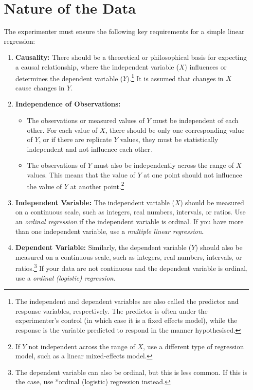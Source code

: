 \documentclass[
  letterpaper,
]{book}
\providecommand{\tightlist}{%
  \setlength{\itemsep}{0pt}\setlength{\parskip}{0pt}}\usepackage{longtable,booktabs,array}
\begin{document}
\section{Nature of the Data}\label{nature-of-the-data}

The experimenter must ensure the following key requirements for a simple
linear regression:

\begin{enumerate}
\def\labelenumi{\arabic{enumi}.}
\item
  \textbf{Causality:} There should be a theoretical or philosophical
  basis for expecting a causal relationship, where the independent
  variable (\(X\)) influences or determines the dependent variable
  (\(Y\)).\footnote{The independent and dependent variables are also
    called the predictor and response variables, respectively. The
    predictor is often under the experimenter's control (in which case
    it is a fixed effects model), while the response is the variable
    predicted to respond in the manner hypothesised.} It is assumed that
  changes in \(X\) cause changes in \(Y\).
\item
  \textbf{Independence of Observations:}

  \begin{itemize}
  \tightlist
  \item
    The observations or measured values of \(Y\) must be independent of
    each other. For each value of \(X\), there should be only one
    corresponding value of \(Y\), or if there are replicate \(Y\)
    values, they must be statistically independent and not influence
    each other.
  \item
    The observations of \(Y\) must also be independently across the
    range of \(X\) values. This means that the value of \(Y\) at one
    point should not influence the value of \(Y\) at another
    point.\footnote{If \(Y\) not independent across the range of \(X\),
      use a different type of regression model, such as a linear
      mixed-effects model.}
  \end{itemize}
\item
  \textbf{Independent Variable:} The independent variable (\(X\)) should
  be measured on a continuous scale, such as integers, real numbers,
  intervals, or ratios. Use an \emph{ordinal regression} if the
  independent variable is ordinal. If you have more than one independent
  variable, use a \emph{multiple linear regression}.
\item
  \textbf{Dependent Variable:} Similarly, the dependent variable (\(Y\))
  should also be measured on a continuous scale, such as integers, real
  numbers, intervals, or ratios.\footnote{The dependent variable can
    also be ordinal, but this is less common. If this is the case, use
    *ordinal (logistic) regression instead.} If your data are not
  continuous and the dependent variable is ordinal, use a \emph{ordinal
  (logistic) regression}.
\end{enumerate}
\end{document}

